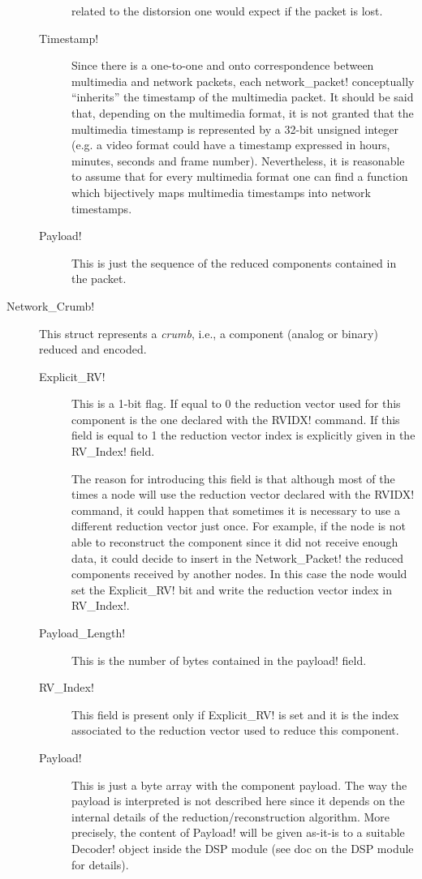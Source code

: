 \documentclass{medusabook}
\begin{document}
\begin{description}
\begin{description}
    related to the distorsion one would expect if the packet is lost.
    \item[\ttt Timestamp!] Since there is a one-to-one and onto
    correspondence between multimedia and network packets, each \ttt
    network_packet! conceptually ``inherits'' the timestamp of the
    multimedia packet.  It should be said that, depending on the
    multimedia format, it is not granted that the multimedia timestamp
    is represented by a 32-bit unsigned integer (e.g. a video format
    could have a timestamp expressed in hours, minutes, seconds and
    frame number).  Nevertheless, it is reasonable to assume that for
    every multimedia format one can find a function which bijectively
    maps multimedia timestamps into network timestamps.
  \item[\ttt Payload!]  This is just the sequence of the reduced
  components contained in the packet.
  \end{description}
  \item[\ttt Network_Crumb!]  This struct represents a \emph{crumb},
   i.e., a component (analog or binary) reduced and encoded.
    \begin{description}
	\item[\ttt Explicit\_RV!] This is a 1-bit flag.  If equal to 0
	the reduction vector used for this component is the one
	declared with the \ttt RVIDX! command.  If this field is equal
	to 1 the reduction vector index is explicitly given in the
	\ttt RV_Index! field.

        The reason for introducing this field is that although most
        of the times a node will use the reduction vector declared
        with the \ttt RVIDX! command, it could happen that sometimes
        it is necessary to use a different reduction vector just
        once.  For example, if the node is not able to reconstruct the
        component since it did not receive enough data, it could
        decide to insert in the \ttt Network_Packet! the reduced
        components received by another nodes.  In this case the node
        would set the \ttt Explicit_RV! bit and write the reduction
        vector index in \ttt RV_Index!.
      \item[\ttt Payload\_Length!] This is the number of bytes
      contained in the \ttt payload! field.
      \item[\ttt RV\_Index!] This field is present only if \ttt
      Explicit\_RV! is set and it is the index associated to the
      reduction vector used to reduce this component.
      \item[\ttt Payload!] This is just a byte array with the
      component payload.  The way the payload is interpreted is not
      described here since it depends on the internal details of the
      reduction/reconstruction algorithm.  More precisely, the
      content of  \ttt Payload! will be given as-it-is to a suitable
      \ttt Decoder! object inside the DSP module (see doc on the DSP
      module for details).
    \end{description}
\end{description}
\end{document}
